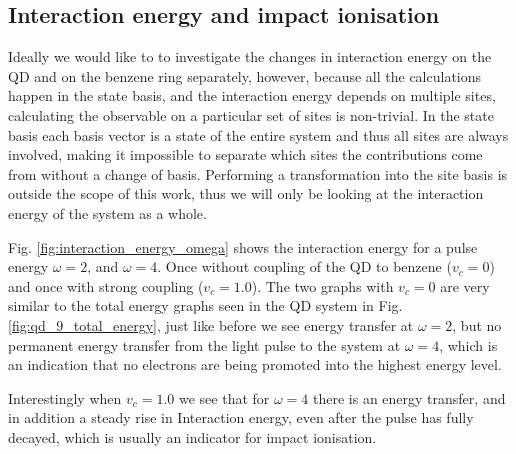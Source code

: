 \subsection{Interaction energy and impact ionisation}
Ideally we would like to to investigate the changes in interaction energy on the QD and on the benzene ring separately, however, because all the calculations happen in the state basis, and the interaction energy depends on multiple sites, calculating the observable on a particular set of sites is non-trivial. In the state basis each basis vector is a state of the entire system and thus all sites are always involved, making it impossible to separate which sites the contributions come from without a change of basis. Performing a transformation into the site basis is outside the scope of this work, thus we will only be looking at the interaction energy of the system as a whole.
\medskip

Fig. \ref{fig:interaction_energy_omega} shows the interaction energy for a pulse energy $\omega = 2$, and $\omega=4$. Once without coupling of the QD to benzene ($v_c=0$) and once with strong coupling ($v_c=1.0$). The two graphs with $v_c=0$ are very similar to the total energy graphs seen in the QD system in Fig. \ref{fig:qd_9_total_energy}, just like before we see energy transfer at $\omega = 2$, but no permanent energy transfer from the light pulse to the system at $\omega = 4$, which is an indication that no electrons are being promoted into the highest energy level.
\medskip

Interestingly when $v_c = 1.0$ we see that for $\omega=4$ there is an energy transfer, and in addition a steady rise in Interaction energy, even after the pulse has fully decayed, which is usually an indicator for impact ionisation.


